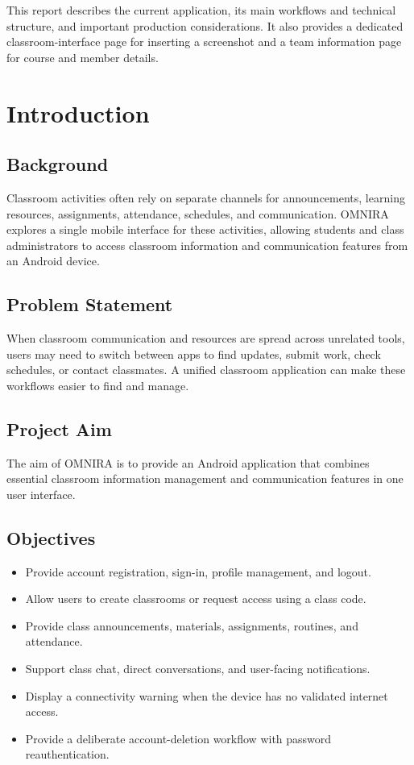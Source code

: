 \documentclass[12pt,a4paper]{report}
\begin{document}
This report describes the current application, its main workflows and technical
structure, and important production considerations. It also provides a dedicated
classroom-interface page for inserting a screenshot and a team information page for
course and member details.

\chapter{Introduction}
\section{Background}
Classroom activities often rely on separate channels for announcements, learning
resources, assignments, attendance, schedules, and communication. OMNIRA explores a
single mobile interface for these activities, allowing students and class administrators
to access classroom information and communication features from an Android device.

\section{Problem Statement}
When classroom communication and resources are spread across unrelated tools, users
may need to switch between apps to find updates, submit work, check schedules, or
contact classmates. A unified classroom application can make these workflows easier
to find and manage.

\section{Project Aim}
The aim of OMNIRA is to provide an Android application that combines essential
classroom information management and communication features in one user interface.

\section{Objectives}
\begin{itemize}[leftmargin=*]
    \item Provide account registration, sign-in, profile management, and logout.
    \item Allow users to create classrooms or request access using a class code.
    \item Provide class announcements, materials, assignments, routines, and attendance.
    \item Support class chat, direct conversations, and user-facing notifications.
    \item Display a connectivity warning when the device has no validated internet access.
    \item Provide a deliberate account-deletion workflow with password reauthentication.
\end{itemize}
\end{document}
